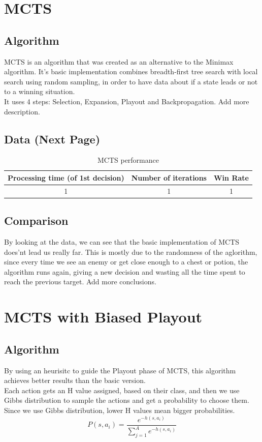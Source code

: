 \documentclass{article}
\begin{document}
  \section{MCTS}
  \subsection{Algorithm}
  MCTS is an algorithm that was created as an alternative to the Minimax algorithm. It's basic implementation combines breadth-first tree search with local search using
  random sampling, in order to have data about if a state leads or not to a winning situation.\\
  It uses 4 steps: Selection, Expansion, Playout and Backpropagation. Add more description.
  
  \subsection{Data (Next Page)}
  \begin{table}[h!]
    \centering
    \caption{MCTS performance}
    \label{tab:tableMCTS1}
    \begin{tabular}{c|c|c}
      \textbf{Processing time (of 1st decision)} & \textbf{Number of iterations} & \textbf{Win Rate}\\
      \hline
      1 & 1 & 1
    \end{tabular}
  \end{table}

  \subsection{Comparison}
  By looking at the data, we can see that the basic implementation of MCTS does'nt lead us really far. This is mostly due to the randomness of the aglorithm, 
  since every time we see an enemy or get close enough to a chest or potion, the algorithm runs again, giving a new decision and wasting all 
  the time spent to reach the previous target.
  Add more conclusions.\\

  \section{MCTS with Biased Playout}
  \subsection{Algorithm}
  By using an heurisitc to guide the Playout phase of MCTS, this algorithm achieves better results than the basic version.\\
  Each action gets an H value assigned, based on their class, and then we use Gibbs distribution to sample the actions and get a probability to choose them. 
  Since we use Gibbs distribution, lower H values mean bigger probabilities.\\
  \[P(s,a_i) = \frac{e^{-h(s, a_i)}}{\sum_{j=1}^{A}e^{-h(s, a_i)}}\]
  
\end{document}
